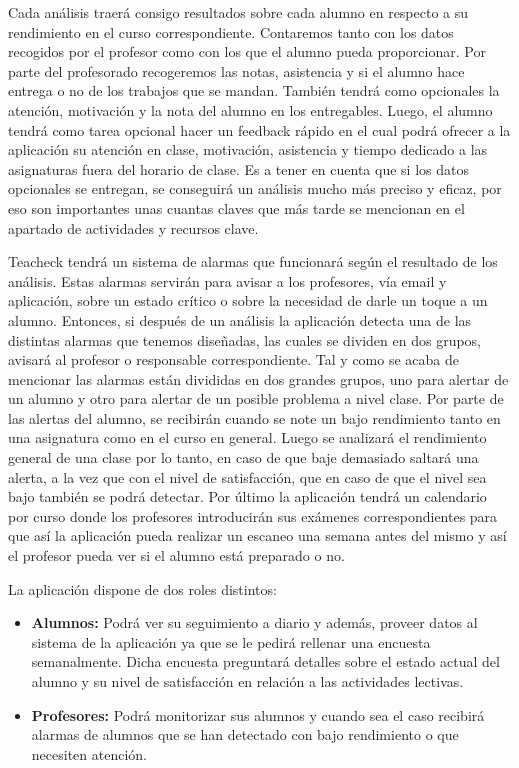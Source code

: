 Cada análisis traerá consigo resultados sobre cada alumno en respecto a su rendimiento en el curso correspondiente. Contaremos tanto con los datos recogidos por el profesor como con los que el alumno pueda proporcionar. Por parte del profesorado recogeremos las notas, asistencia y si el alumno hace entrega o no de los trabajos que se mandan. También tendrá como opcionales la atención, motivación y la nota del alumno en los entregables. Luego, el alumno tendrá como tarea opcional hacer un feedback rápido en el cual podrá ofrecer a la aplicación su atención en clase, motivación, asistencia y tiempo dedicado a las asignaturas fuera del horario de clase. Es a tener en cuenta que si los datos opcionales se entregan, se conseguirá un análisis mucho más preciso y eficaz, por eso son importantes unas cuantas claves que más tarde se mencionan en el apartado de actividades y recursos clave.

Teacheck tendrá un sistema de alarmas que funcionará según el resultado de los análisis. Estas alarmas servirán para avisar a los profesores, vía email y aplicación, sobre un estado crítico o sobre la necesidad de darle un toque a un alumno. Entonces, si después de un análisis la aplicación detecta una de las distintas alarmas que tenemos diseñadas, las cuales se dividen en dos grupos, avisará al profesor o responsable correspondiente. Tal y como se acaba de mencionar las alarmas están divididas en dos grandes grupos, uno para alertar de un alumno y otro para alertar de un posible problema a nivel clase. Por parte de las alertas del alumno, se recibirán cuando se note un bajo rendimiento tanto en una asignatura como en el curso en general. Luego se analizará el rendimiento general de una clase por lo tanto, en caso de que baje demasiado saltará una alerta, a la vez que con el nivel de satisfacción, que en caso de que el nivel sea bajo también se podrá detectar. Por último la aplicación tendrá un calendario por curso donde los profesores introducirán sus exámenes correspondientes para que así la aplicación pueda realizar un escaneo una semana antes del mismo y así el profesor pueda ver si el alumno está preparado o no.

La aplicación dispone de dos roles distintos:
\begin{itemize}
\item \textbf{Alumnos:} Podrá ver su seguimiento a diario y además, proveer datos al sistema de la aplicación ya que se le pedirá rellenar una encuesta semanalmente. Dicha encuesta preguntará detalles sobre el estado actual del alumno y su nivel de satisfacción en relación a las actividades lectivas.  

\item \textbf{Profesores:} Podrá monitorizar sus alumnos y cuando sea el caso recibirá alarmas de alumnos que se han detectado con bajo rendimiento o que necesiten atención.
\end{itemize}

